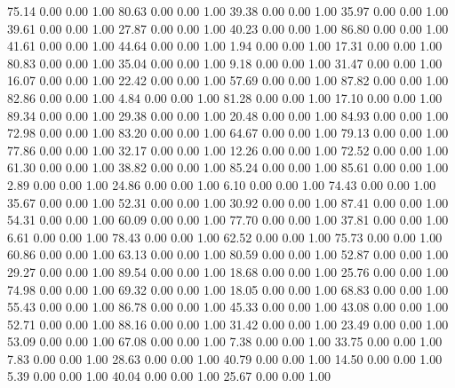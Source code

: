    75.14   0.00   0.00   1.00
   80.63   0.00   0.00   1.00
   39.38   0.00   0.00   1.00
   35.97   0.00   0.00   1.00
   39.61   0.00   0.00   1.00
   27.87   0.00   0.00   1.00
   40.23   0.00   0.00   1.00
   86.80   0.00   0.00   1.00
   41.61   0.00   0.00   1.00
   44.64   0.00   0.00   1.00
    1.94   0.00   0.00   1.00
   17.31   0.00   0.00   1.00
   80.83   0.00   0.00   1.00
   35.04   0.00   0.00   1.00
    9.18   0.00   0.00   1.00
   31.47   0.00   0.00   1.00
   16.07   0.00   0.00   1.00
   22.42   0.00   0.00   1.00
   57.69   0.00   0.00   1.00
   87.82   0.00   0.00   1.00
   82.86   0.00   0.00   1.00
    4.84   0.00   0.00   1.00
   81.28   0.00   0.00   1.00
   17.10   0.00   0.00   1.00
   89.34   0.00   0.00   1.00
   29.38   0.00   0.00   1.00
   20.48   0.00   0.00   1.00
   84.93   0.00   0.00   1.00
   72.98   0.00   0.00   1.00
   83.20   0.00   0.00   1.00
   64.67   0.00   0.00   1.00
   79.13   0.00   0.00   1.00
   77.86   0.00   0.00   1.00
   32.17   0.00   0.00   1.00
   12.26   0.00   0.00   1.00
   72.52   0.00   0.00   1.00
   61.30   0.00   0.00   1.00
   38.82   0.00   0.00   1.00
   85.24   0.00   0.00   1.00
   85.61   0.00   0.00   1.00
    2.89   0.00   0.00   1.00
   24.86   0.00   0.00   1.00
    6.10   0.00   0.00   1.00
   74.43   0.00   0.00   1.00
   35.67   0.00   0.00   1.00
   52.31   0.00   0.00   1.00
   30.92   0.00   0.00   1.00
   87.41   0.00   0.00   1.00
   54.31   0.00   0.00   1.00
   60.09   0.00   0.00   1.00
   77.70   0.00   0.00   1.00
   37.81   0.00   0.00   1.00
    6.61   0.00   0.00   1.00
   78.43   0.00   0.00   1.00
   62.52   0.00   0.00   1.00
   75.73   0.00   0.00   1.00
   60.86   0.00   0.00   1.00
   63.13   0.00   0.00   1.00
   80.59   0.00   0.00   1.00
   52.87   0.00   0.00   1.00
   29.27   0.00   0.00   1.00
   89.54   0.00   0.00   1.00
   18.68   0.00   0.00   1.00
   25.76   0.00   0.00   1.00
   74.98   0.00   0.00   1.00
   69.32   0.00   0.00   1.00
   18.05   0.00   0.00   1.00
   68.83   0.00   0.00   1.00
   55.43   0.00   0.00   1.00
   86.78   0.00   0.00   1.00
   45.33   0.00   0.00   1.00
   43.08   0.00   0.00   1.00
   52.71   0.00   0.00   1.00
   88.16   0.00   0.00   1.00
   31.42   0.00   0.00   1.00
   23.49   0.00   0.00   1.00
   53.09   0.00   0.00   1.00
   67.08   0.00   0.00   1.00
    7.38   0.00   0.00   1.00
   33.75   0.00   0.00   1.00
    7.83   0.00   0.00   1.00
   28.63   0.00   0.00   1.00
   40.79   0.00   0.00   1.00
   14.50   0.00   0.00   1.00
    5.39   0.00   0.00   1.00
   40.04   0.00   0.00   1.00
   25.67   0.00   0.00   1.00
